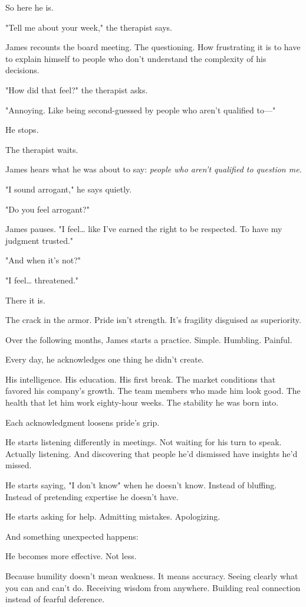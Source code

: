 \documentclass[11pt,twoside]{book}
\begin{document}
So here he is.

"Tell me about your week," the therapist says.

James recounts the board meeting. The questioning. How frustrating it is to have to explain himself to people who don't understand the complexity of his decisions.

"How did that feel?" the therapist asks.

"Annoying. Like being second-guessed by people who aren't qualified to—"

He stops.

The therapist waits.

James hears what he was about to say: \emph{people who aren't qualified to question me.}

"I sound arrogant," he says quietly.

"Do you feel arrogant?"

James pauses. "I feel\ldots{} like I've earned the right to be respected. To have my judgment trusted."

"And when it's not?"

"I feel\ldots{} threatened."

There it is.

The crack in the armor. Pride isn't strength. It's fragility disguised as superiority.

Over the following months, James starts a practice. Simple. Humbling. Painful.

Every day, he acknowledges one thing he didn't create.

His intelligence. His education. His first break. The market conditions that favored his company's growth. The team members who made him look good. The health that let him work eighty-hour weeks. The stability he was born into.

Each acknowledgment loosens pride's grip.

He starts listening differently in meetings. Not waiting for his turn to speak. Actually listening. And discovering that people he'd dismissed have insights he'd missed.

He starts saying, "I don't know" when he doesn't know. Instead of bluffing. Instead of pretending expertise he doesn't have.

He starts asking for help. Admitting mistakes. Apologizing.

And something unexpected happens:

He becomes more effective. Not less.

Because humility doesn't mean weakness. It means accuracy. Seeing clearly what you can and can't do. Receiving wisdom from anywhere. Building real connection instead of fearful deference.
\end{document}
